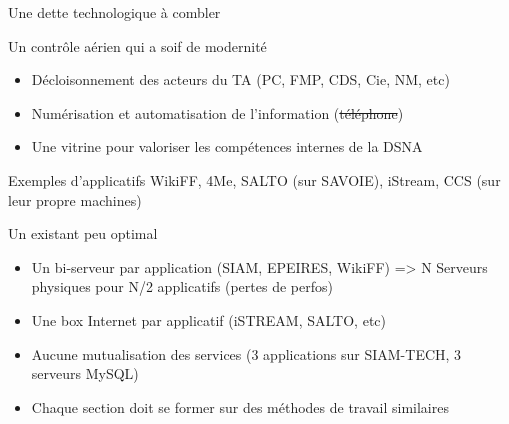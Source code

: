 \begin{frame}{Une dette technologique à combler}
\begin{block}{Un contrôle aérien qui a soif de modernité}
\begin{itemize}
    \item Décloisonnement des acteurs du TA (PC, FMP, CDS, Cie, NM, etc) \pause
    \item Numérisation et automatisation de l'information (\sout{téléphone}) \pause
    \item Une vitrine pour valoriser les compétences internes de la DSNA 
\end{itemize}
\end{block} 
 \begin{exampleblock}{Exemples d'applicatifs}
 WikiFF, 4Me, SALTO (sur SAVOIE), iStream, CCS (sur leur propre machines)
\end{exampleblock}
\begin{block}{Un existant peu optimal}
\begin{itemize}
\item Un bi-serveur par application (SIAM, EPEIRES, WikiFF) => N Serveurs physiques pour N/2 applicatifs (pertes de perfos) \pause
\item Une box Internet par applicatif (iSTREAM, SALTO, etc) \pause
\item Aucune mutualisation des services (3 applications sur SIAM-TECH, 3 serveurs MySQL) \pause
\item Chaque section doit se former sur des méthodes de travail similaires 
\end{itemize}
\end{block}
\end{frame}

